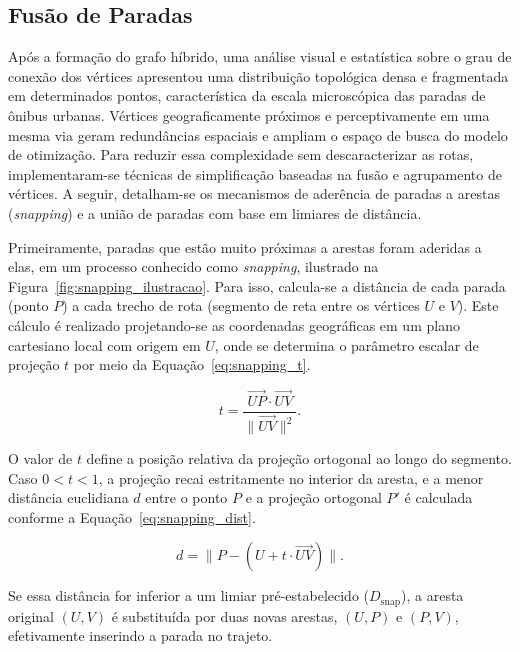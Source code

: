 \documentclass[cic,tc]{infufrgs}
\begin{document}
\subsection{Fusão de Paradas}
\label{subsec:snapping}

Após a formação do grafo híbrido, uma análise visual e estatística sobre o grau de conexão dos vértices apresentou uma distribuição topológica densa e fragmentada em determinados pontos, característica da escala microscópica das paradas de ônibus urbanas. Vértices geograficamente próximos e perceptivamente em uma mesma via geram redundâncias espaciais e ampliam o espaço de busca do modelo de otimização. Para reduzir essa complexidade sem descaracterizar as rotas, implementaram-se técnicas de simplificação baseadas na fusão e agrupamento de vértices. A seguir, detalham-se os mecanismos de aderência de paradas a arestas (\textit{snapping}) e a união de paradas com base em limiares de distância.

Primeiramente, paradas que estão muito próximas a arestas foram aderidas a elas, em um processo conhecido como \textit{snapping}, ilustrado na Figura~\ref{fig:snapping_ilustracao}. Para isso, calcula-se a distância de cada parada (ponto $P$) a cada trecho de rota (segmento de reta entre os vértices $U$ e $V$). Este cálculo é realizado projetando-se as coordenadas geográficas em um plano cartesiano local com origem em $U$, onde se determina o parâmetro escalar de projeção $t$ por meio da Equação~\ref{eq:snapping_t}.

\begin{equation}
t = \frac{\vec{UP} \cdot \vec{UV}}{\|\vec{UV}\|^2}.
\label{eq:snapping_t}
\end{equation}

O valor de $t$ define a posição relativa da projeção ortogonal ao longo do segmento. Caso $0 < t < 1$, a projeção recai estritamente no interior da aresta, e a menor distância euclidiana $d$ entre o ponto $P$ e a projeção ortogonal $P'$ é calculada conforme a Equação~\ref{eq:snapping_dist}.

\begin{equation}
d = \|P - (U + t \cdot \vec{UV})\|.
\label{eq:snapping_dist}
\end{equation}

Se essa distância for inferior a um limiar pré-estabelecido ($D_{\text{snap}}$), a aresta original $(U,V)$ é substituída por duas novas arestas, $(U,P)$ e $(P,V)$, efetivamente inserindo a parada no trajeto.
\end{document}
